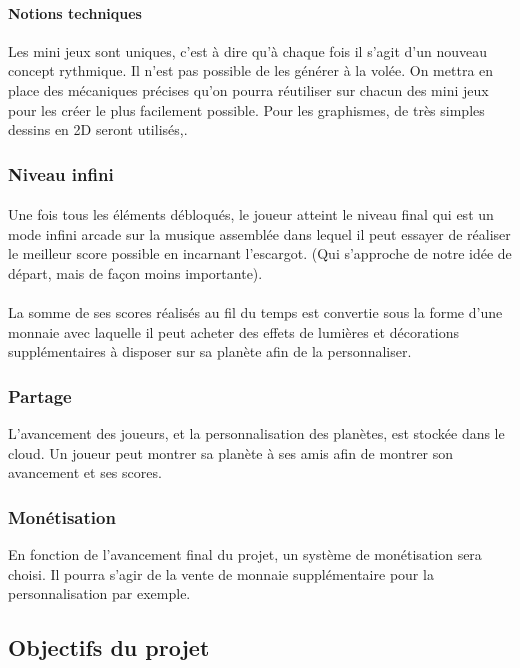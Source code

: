 \paragraph{Notions techniques}
Les mini jeux sont uniques, c’est à dire qu’à chaque fois il s’agit d’un nouveau concept rythmique. Il n’est pas possible de les générer à la volée. On mettra en place des mécaniques précises qu’on pourra réutiliser sur chacun des mini jeux pour les créer le plus facilement possible. Pour les graphismes, de très simples dessins en 2D seront utilisés,. 

\subsubsection{Niveau infini}
\paragraph{} Une fois tous les éléments débloqués, le joueur atteint le niveau final qui est un mode infini arcade sur la musique assemblée dans lequel il peut essayer de réaliser le meilleur score possible en incarnant l’escargot. (Qui s’approche de notre idée de départ, mais de façon moins importante).

\paragraph{} La somme de ses scores réalisés au fil du temps est convertie sous la forme d’une monnaie avec laquelle il peut acheter des effets de lumières et décorations supplémentaires à disposer sur sa planète afin de la personnaliser.

\subsubsection{Partage}
L’avancement des joueurs, et la personnalisation des planètes, est stockée dans le cloud. Un joueur peut montrer sa planète à ses amis afin de montrer son avancement et ses scores.

\subsubsection{Monétisation}
En fonction de l’avancement final du projet, un système de monétisation sera choisi. Il pourra s’agir de la vente de monnaie supplémentaire pour la personnalisation par exemple.

\subsection{Objectifs du projet}

